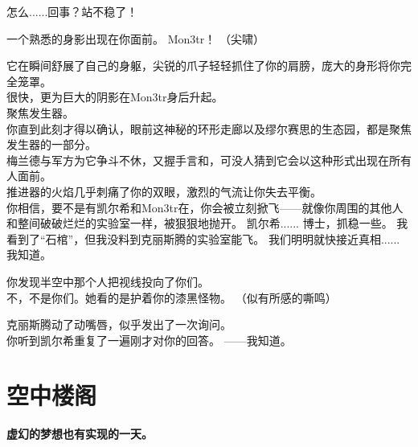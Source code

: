 \documentclass[openany]{book}
\begin{document}
\begin{dialogue}
     怎么......回事？站不稳了！\par
    一个熟悉的身影出现在你面前。
     Mon3tr！
     （尖啸）\par
    它在瞬间舒展了自己的身躯，尖锐的爪子轻轻抓住了你的肩膀，庞大的身形将你完全笼罩。\\
    很快，更为巨大的阴影在Mon3tr身后升起。\\
    聚焦发生器。\\
    你直到此刻才得以确认，眼前这神秘的环形走廊以及缪尔赛思的生态园，都是聚焦发生器的一部分。\\
    梅兰德与军方为它争斗不休，又握手言和，可没人猜到它会以这种形式出现在所有人面前。\\
    推进器的火焰几乎刺痛了你的双眼，激烈的气流让你失去平衡。\\
    你相信，要不是有凯尔希和Mon3tr在，你会被立刻掀飞——就像你周围的其他人和整间破破烂烂的实验室一样，被狠狠地抛开。
     凯尔希......
     博士，抓稳一些。
     我看到了“石棺”，但我没料到克丽斯腾的实验室能飞。
     我们明明就快接近真相......
     我知道。\par
    你发现半空中那个人把视线投向了你们。\\
    不，不是你们。她看的是护着你的漆黑怪物。
     （似有所感的嘶鸣）\par
    克丽斯腾动了动嘴唇，似乎发出了一次询问。\\
    你听到凯尔希重复了一遍刚才对你的回答。
     ——我知道。
\end{dialogue}

\chapter{空中楼阁}
\begin{center} \textbf{虚幻的梦想也有实现的一天。}\end{center} \par
\clearpage
\end{document}
